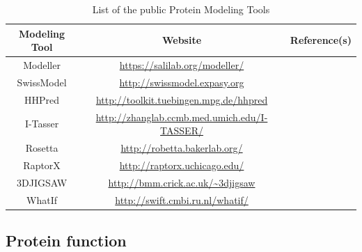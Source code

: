 \documentclass[12pt, a4paper,twoside]{tesi_upf}
\newcommand\tr{\rule{0pt}{3.5ex}}
\newcommand\br{\rule[-3ex]{0pt}{3ex}}
\begin{document}
\renewcommand{\arraystretch}{1.2} %

\begin{table}[h!]
 \centering
 \begin{adjustbox}{width=1\textwidth}
 \begin{tabular}{||c | c |c||} 
 \hline
 \tr\textbf{Modeling Tool}\br & \tr\textbf{Website}\br & \tr\textbf{Reference(s)}\br\\  
 \hline
 Modeller & \url{https://salilab.org/modeller/} & \cite{Eswar2007, Sali1993}  \\ 
 \hline
 SwissModel & \url{http://swissmodel.expasy.org} & \cite{Biasini2014} \\
 \hline
 HHPred & \url{http://toolkit.tuebingen.mpg.de/hhpred} & \cite{Soding2005}  \\
 \hline
 I-Tasser & \url{http://zhanglab.ccmb.med.umich.edu/I-TASSER/} & \cite{Yang2015a, Roy2010, Zhang2008}  \\
 \hline
 Rosetta & \url{http://robetta.bakerlab.org/} & \cite{Kim2004}   \\ 
 \hline
 RaptorX & \url{http://raptorx.uchicago.edu/} & \cite{Kallberg2014} \\
 \hline
 3DJIGSAW & \url{http://bmm.crick.ac.uk/~3djigsaw} & \cite{Bates2001} \\
 \hline 
  WhatIf & \url{http://swift.cmbi.ru.nl/whatif/} & \cite{Vriend1990} \\
   \hline
\end{tabular}
\end{adjustbox}
\label{table:table_software}
\caption{List of the public Protein Modeling Tools}
\end{table}




\subsection{Protein function}
\end{document}

